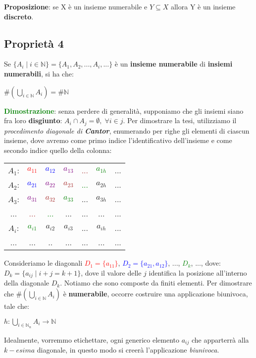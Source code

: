 \textbf{Proposizione}: se X è un insieme numerabile e $Y \subseteq X$ allora Y è un insieme \textbf{discreto}.

\newpage
\subsection{Proprietà 4}
Se $\{A_i \; | \; i \in \mathbb{N}\} = \{A_1, A_2, ..., A_i, ...\}$ è un \textbf{insieme numerabile} di \textbf{insiemi numerabili}, si ha che:
\begin{center}
    $\#(\bigcup_{i \in \mathbb{N}}A_i) = \#\mathbb{N}$
\end{center}
\textcolor{green}{\textbf{Dimostrazione}}: senza perdere di generalità, supponiamo che gli insiemi siano fra loro \textbf{disgiunto}: $A_i \cap A_j = \emptyset, \; \forall i \in j$. Per dimostrare la tesi, utilizziamo il \textit{procedimento diagonale di \textbf{Cantor}}, enumerando per righe gli elementi di ciascun insieme, dove avremo come primo indice l'identificativo dell'insieme e come secondo indice quello della colonna:

\begin{center}
    \begin{tabular}{ccccccc}
        $A_1$: & \textcolor{red}{$a_{11}$} & \textcolor{blue}{$a_{12}$} & \textcolor{purple}{$a_{13}$} & \textcolor{brown}{...} & \textcolor{green}{$a_{1h}$} & ... \\
        $A_2$: & \textcolor{blue}{$a_{21}$} & \textcolor{purple}{$a_{22}$} & \textcolor{brown}{$a_{23}$} & \textcolor{green}{...} & $a_{2h}$ & ... \\
        $A_3$: & \textcolor{purple}{$a_{31}$} & \textcolor{brown}{$a_{32}$} & \textcolor{green}{$a_{33}$} & ... & $a_{3h}$ & ... \\
        ... & \textcolor{brown}{...} & \textcolor{green}{...} & ... & ... & ... & ... \\
        $A_i$: & \textcolor{green}{$a_{i1}$} & $a_{i2}$ & $a_{i3}$ & ... & $a_{ih}$ & ... \\
        ... & ... & .. & ... & ... & ... & ... \\
    \end{tabular}
\end{center}
Consideriamo le diagonali \textcolor{red}{$D_1=\{a_{11}\}$}, \textcolor{blue}{$D_2=\{a_{21}, a_{12}\}$}, ..., \textcolor{green}{$D_k$}, ..., dove: $D_k = \{a_{ij} \; | \; i + j = k + 1\}$, dove il valore delle $j$ identifica la posizione all'interno della diagonale $D_k$. Notiamo che sono composte da finiti elementi. Per dimostrare che $\#(\bigcup_{i \in \mathbb{N}}A_i)$ è \textbf{numerabile}, occorre costruire una applicazione biunivoca, tale che:
\begin{center}
    $h : \bigcup_{i \in \mathbb{N}_n} A_i \rightarrow \mathbb{N}$
\end{center}
Idealmente, vorremmo etichettare, ogni generico elemento $a_{ij}$ che apparterrà alla $k-esima$ diagonale, in questo modo si creerà l'applicazione \textit{biunivoca}.

